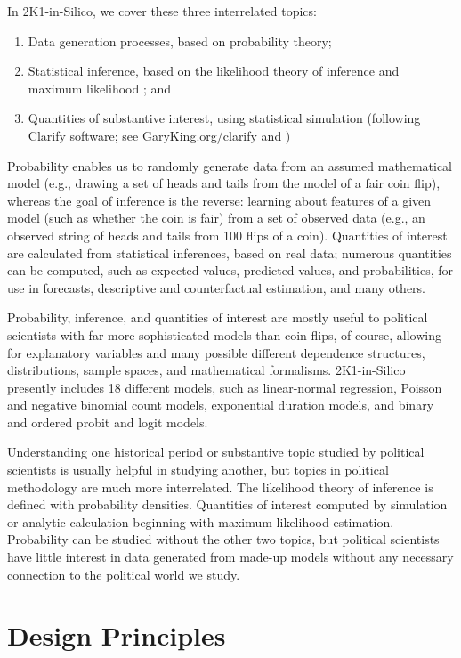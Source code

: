 \documentclass[12pt]{article}
\theoremstyle{definition}
\begin{document}
In 2K1-in-Silico, we cover these three interrelated topics:
\begin{enumerate}
 \item Data generation processes, based on probability theory;
 \item Statistical inference, based on the likelihood theory of inference and maximum likelihood \citep{King98}; and
 \item Quantities of substantive interest, using statistical simulation (following Clarify software; see \href{https://GaryKing.org/clarify}{GaryKing.org/clarify} and \citealt{KinTomWit00b})
\end{enumerate}

Probability enables us to randomly generate data from an assumed mathematical model (e.g., drawing a set of heads and tails from the model of a fair coin flip), whereas the goal of inference is the reverse: learning about features of a given model (such as whether the coin is fair) from a set of observed data (e.g., an observed string of heads and tails from 100 flips of a coin). Quantities of interest are calculated from statistical inferences, based on real data; numerous quantities can be computed, such as expected values, predicted values, and probabilities, for use in forecasts, descriptive and counterfactual estimation, and many others.

Probability, inference, and quantities of interest are mostly useful to political scientists with far more sophisticated models than coin flips, of course, allowing for explanatory variables and many possible different dependence structures, distributions, sample spaces, and mathematical formalisms.  2K1-in-Silico presently includes 18 different models, such as linear-normal regression, Poisson and negative binomial count models, exponential duration models, and binary and ordered probit and logit models.

Understanding one historical period or substantive topic studied by political scientists is usually helpful in studying another, but topics in political methodology are much more interrelated.  The likelihood theory of inference is defined with probability densities. Quantities of interest computed by simulation or analytic calculation beginning with maximum likelihood estimation. Probability can be studied without the other two topics, but political scientists have little interest in data generated from made-up models without any necessary connection to the political world we study.

\section{Design Principles}
\end{document}

